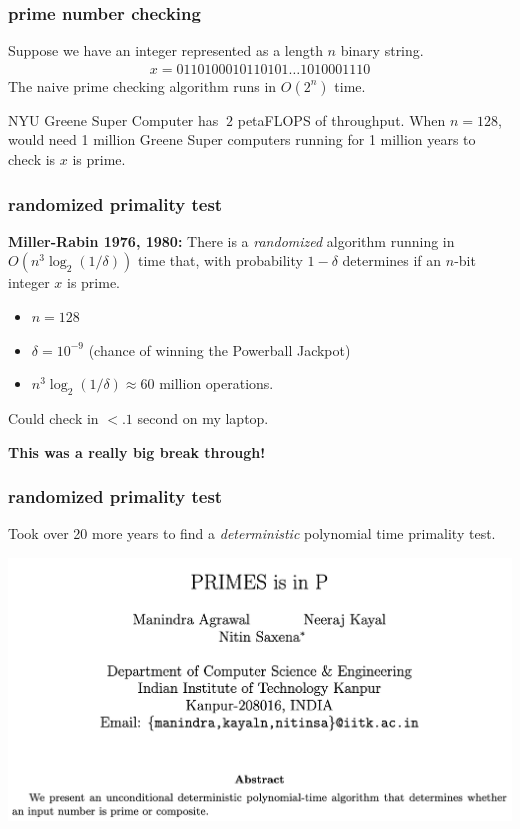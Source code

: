 \documentclass[compress]{beamer}
\begin{document}
\begin{frame}
	\frametitle{prime number checking}
	Suppose we have an integer represented as a length $n$ binary string. 
	\begin{align*}
		x = 0110100010110101\ldots1010001110
	\end{align*}
The naive prime checking algorithm runs in $O(2^n)$ time. 

NYU Greene Super Computer has $~ 2$ petaFLOPS of throughput. When $n = 128$, would need 1 million Greene Super computers running for 1 million years to check is $x$ is prime. 
\end{frame}

\begin{frame}
	\frametitle{randomized primality test}
	\textbf{Miller-Rabin 1976, 1980:} There is a \emph{randomized} algorithm running in $O(n^3 \log_2(1/\delta))$ time that, with probability $1-\delta$ determines if an $n$-bit integer $x$ is prime.  
	\begin{itemize}
		\item $n = 128$
		\item $\delta = 10^{-9}$ (chance of winning the Powerball Jackpot)
		\item $n^3\log_2(1/\delta) \approx 60$ million operations.
	\end{itemize}
	Could check in $< .1$ second on my laptop.
	\begin{center}
		\large \alert{\textbf{This was a really big break through!}}
	\end{center}
\end{frame}

\begin{frame}
	\frametitle{randomized primality test}
	Took over 20 more years to find a \emph{deterministic} polynomial time primality test.
	\begin{center}
		\includegraphics[width=\textwidth]{primes_in_p.png}
	\end{center}
\end{frame}
\end{document}
